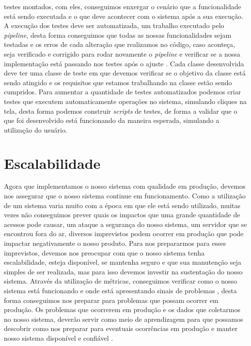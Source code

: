         testes montados, com eles, conseguimos enxergar o cenário que a funcionalidade
        está sendo executada e o que deve acontecer com o sistema após a sua execução.
        \newline
        A execução dos testes deve ser automatizada, um trabalho executado pelo
        \textit{pipeline}, desta forma conseguimos que todas as nossas funcionalidades
        sejam testadas e os erros de cada alteração que realizamos no código, caso
        aconteça, seja verificado e corrigido para rodar novamente o \textit{pipeline}
        e verificar se a nossa implementação está passando nos testes após o ajuste
        \cite{ContinuousDelivery}. Cada classe desenvolvida deve ter uma classe
        de teste em que devemos verificar se o objetivo da classe está sendo atingido
        e os requisitos que estamos trabalhando na classe estão sendo cumpridos.
        Para aumentar a quantidade de testes automatizados podemos criar testes
        que executem automaticamente operações no sistema, simulando cliques na
        tela, desta forma podemos construir \textit{scripts} de testes, de forma
        a validar que o que foi desenvolvido está funcionando da maneira esperada,
        simulando a utilização do usuário. \newline

      \section{Escalabilidade}
        Agora que implementamos o nosso sistema com qualidade em produção, devemos
        nos assegurar que o nosso sistema continue em funcionamento. Como a utilização
        de um sistema varia muito com a época em que ele está sendo utilizado, muitas
        vezes não conseguimos prever quais os impactos que uma grande quantidade de
        acessos pode causar, um ataque a segurança do nosso sistema, um servidor
        que se encontrou fora do ar, diversos imprevistos podem ocorrer em produção
        que pode impactar negativamente o nosso produto. \newline
        Para nos prepararmos para esses imprevistos, devemos nos preocupar com que
        o nosso sistema tenha escalabilidade, esteja disponível, se mantenha
        seguro e que sua manutenção seja simples de ser realizada, mas para isso
        devemos investir na sustentação do nosso sistema. Através da utilização
        de métricas, conseguimos verificar como o nosso sistema está funcionando e
        onde está apresentando sinais de problemas \cite{TheDevOpsHandbook}, desta
        forma conseguimos nos preparar para problemas que possam ocorrer em produção.
        Os problemas que ocorrerem em produção e os dados que coletarmos no nosso
        sistema, deverão servir como meio de aprendizagem para que possamos descobrir
        como nos preparar para eventuais ocorrências em produção e manter nosso
        sistema disponível e confiável \cite{SiteReliabilityEngineering}.
